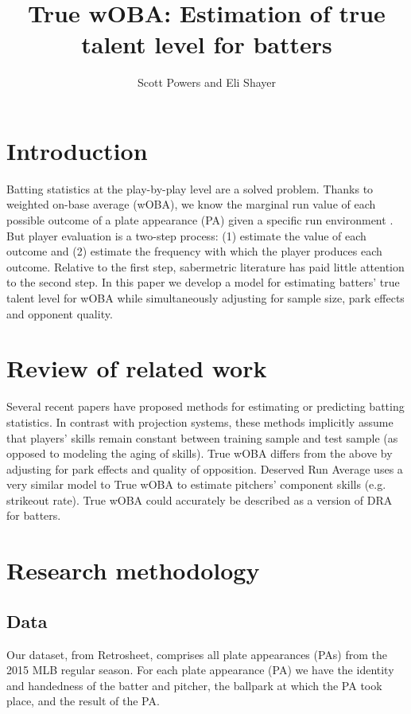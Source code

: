 \documentclass[11pt]{article}
\title{True wOBA: Estimation of true talent level for batters}
\author{Scott Powers and Eli Shayer}
\begin{document}
\maketitle

\section{Introduction}

Batting statistics at the play-by-play level are a solved problem. Thanks to
weighted on-base average (wOBA), we know the marginal run value of each
possible outcome of a plate appearance (PA) given a specific run environment
\citep{TheBook}. But player evaluation is a two-step process: (1) estimate the
value of each outcome and (2) estimate the frequency with which the player
produces each outcome. Relative to the first step, sabermetric literature has
paid little attention to the second step. In this paper we develop a model for
estimating batters' true talent level for wOBA while simultaneously adjusting
for sample size, park effects and opponent quality.

\section{Review of related work}

Several recent papers \citep{Brown08, Null09, Neal.etal10, Albert15} have
proposed methods for estimating or predicting batting statistics. In contrast
with projection systems, these methods implicitly assume that players' skills
remain constant between training sample and test sample (as opposed to
modeling the aging of skills). True wOBA differs from the above by adjusting
for park effects and quality of opposition. Deserved Run Average
\citep{Judge15} uses a very similar model to True wOBA to estimate pitchers'
component skills (e.g. strikeout rate). True wOBA could accurately be described
as a version of DRA for batters.

\section{Research methodology}

\subsection{Data}

Our dataset, from Retrosheet, comprises all plate appearances (PAs) from the
2015 MLB regular season. For each plate appearance (PA) we have the identity
and handedness of the batter and pitcher, the ballpark at which the PA took
place, and the result of the PA.
\end{document}
